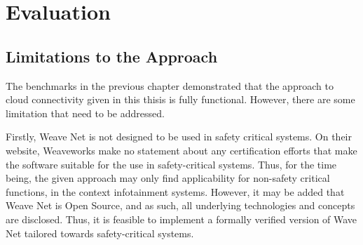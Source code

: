 \section{Evaluation}
\label{sec:evaluation}


\subsection{Limitations to the Approach}

The benchmarks in the previous chapter demonstrated that the approach to cloud connectivity given in this thisis is fully functional. However, there are some limitation that need to be addressed.

Firstly, Weave Net is not designed to be used in safety critical systems. On their website, Weaveworks make no statement about any certification efforts that make the software suitable for the use in safety-critical systems. Thus, for the time being, the given approach may only find applicability for non-safety critical functions, \eg in the context infotainment systems. However, it may be added that Weave Net is Open Source, and as such, all underlying technologies and concepts are disclosed. Thus, it is feasible to implement a formally verified version of Wave Net tailored towards safety-critical systems.